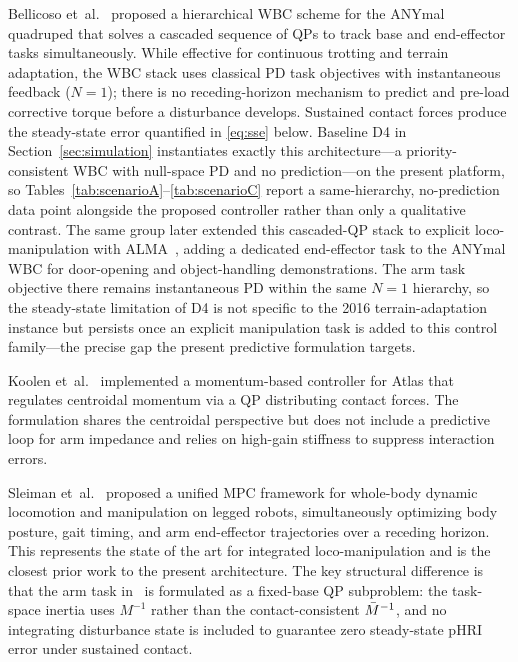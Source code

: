 Bellicoso et~al.~\cite{bellicoso2016perception} proposed a hierarchical WBC
scheme for the ANYmal quadruped that solves a cascaded sequence of QPs to
track base and end-effector tasks simultaneously.
While effective for continuous trotting and terrain adaptation, the WBC
stack uses classical PD task objectives with instantaneous feedback
($N{=}1$); there is no receding-horizon mechanism to predict and pre-load
corrective torque before a disturbance develops.
Sustained contact forces produce the steady-state error quantified in
\eqref{eq:sse} below. Baseline D4 in Section~\ref{sec:simulation} instantiates
exactly this architecture---a priority-consistent WBC with null-space PD and
no prediction---on the present platform, so
Tables~\ref{tab:scenarioA}--\ref{tab:scenarioC} report a same-hierarchy,
no-prediction data point alongside the proposed controller rather than only a
qualitative contrast.
The same group later extended this cascaded-QP stack to explicit
loco-manipulation with ALMA~\cite{bellicoso2019alma}, adding a dedicated
end-effector task to the ANYmal WBC for door-opening and object-handling
demonstrations. The arm task objective there remains instantaneous PD within
the same $N{=}1$ hierarchy, so the steady-state limitation of D4 is not
specific to the 2016 terrain-adaptation instance but persists once an
explicit manipulation task is added to this control family---the precise gap
the present predictive formulation targets.

Koolen et~al.~\cite{koolen2016design} implemented a momentum-based
controller for Atlas that regulates centroidal momentum via a QP
distributing contact forces.
The formulation shares the centroidal perspective but does not include a
predictive loop for arm impedance and relies on high-gain stiffness to
suppress interaction errors.

Sleiman et~al.~\cite{sleiman2021unified} proposed a unified MPC framework
for whole-body dynamic locomotion and manipulation on legged robots,
simultaneously optimizing body posture, gait timing, and arm end-effector
trajectories over a receding horizon.
This represents the state of the art for integrated loco-manipulation and
is the closest prior work to the present architecture.
The key structural difference is that the arm task in~\cite{sleiman2021unified}
is formulated as a fixed-base QP subproblem: the task-space inertia uses
$M^{-1}$ rather than the contact-consistent $\bar{M}^{-1}$, and no integrating
disturbance state is included to guarantee zero steady-state pHRI error
under sustained contact.

